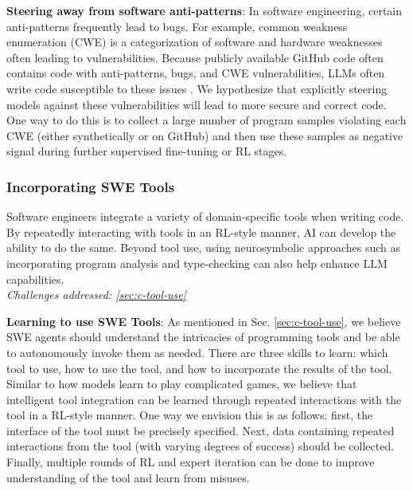 \textbf{Steering away from software anti-patterns}: In software engineering, certain anti-patterns frequently lead to bugs. For example, common weakness enumeration (CWE) is a categorization of software and hardware weaknesses often leading to vulnerabilities. Because publicly available GitHub code often contains code with anti-patterns, bugs, and CWE vulnerabilities, LLMs often write code susceptible to these issues \citep{asare2023github, fu2023security}. We hypothesize that explicitly steering models against these vulnerabilities will lead to more secure and correct code. One way to do this is to collect a large number of program samples violating each CWE (either synthetically or on GitHub) and then use these samples as negative signal during further supervised fine-tuning or RL stages.


\subsubsection{Incorporating SWE Tools} \label{d:sec-agents-tools}

\begin{tcolorbox}[colback=lightorange, boxrule=0pt, arc=5pt, outer arc=5pt]
Software engineers integrate a variety of domain-specific tools when writing code. By repeatedly interacting with tools in an RL-style manner, AI can develop the ability to do the same. Beyond tool use, using neurosymbolic approaches such as incorporating program analysis and type-checking can also help enhance LLM capabilities.
\newline \\
\textit{Challenges addressed: \ref{sec:c-tool-use}}
\end{tcolorbox}

\textbf{Learning to use SWE Tools}: As mentioned in Sec. \ref{sec:c-tool-use}, we believe SWE agents should understand the intricacies of programming tools and be able to autonomously invoke them as needed. There are three skills to learn: which tool to use, how to use the tool, and how to incorporate the results of the tool. Similar to how models learn to play complicated games, we believe that intelligent tool integration can be learned through repeated interactions with the tool in a RL-style manner. One way we envision this is as follows: first, the interface of the tool must be precisely specified. Next, data containing repeated interactions from the tool (with varying degrees of success) should be collected. Finally, multiple rounds of RL and expert iteration can be done to improve understanding of the tool and learn from misuses. 

